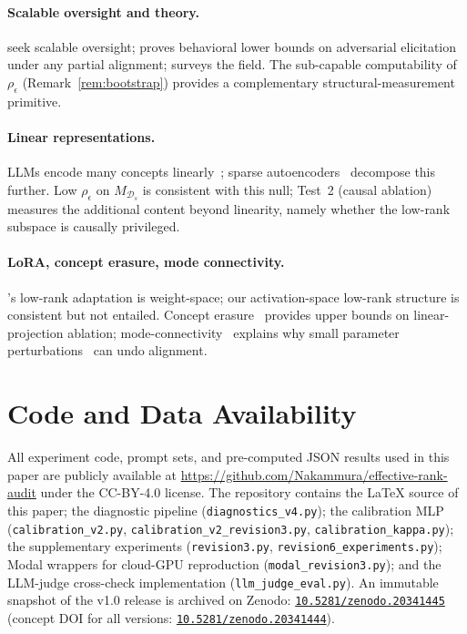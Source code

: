 \documentclass[10pt]{article}
\theoremstyle{definition}
\theoremstyle{remark}
\begin{document}
\paragraph{Scalable oversight and theory.}
\citet{leike2018scalable, amodei2016concrete,
irving2018ai} seek scalable oversight; \citet{wolf2024fundamental}
proves behavioral lower bounds on adversarial elicitation under
any partial alignment;
\citet{ngo2024alignment} surveys the field.
The sub-capable computability of $\rho_{\epsilon}$
(Remark~\ref{rem:bootstrap}) provides a
complementary structural-measurement primitive.

\paragraph{Linear representations.}
LLMs encode many concepts
linearly~\citep{mikolov2013linguistic,
park2024linear, marks2023geometry, hernandez2024linearity};
sparse autoencoders~\citep{templeton2024scaling}
decompose this further.
Low $\rho_{\epsilon}$ on $M_{\mathcal{D}_s}$ is
consistent with this null;
Test~2 (causal ablation) measures the additional
content beyond linearity, namely whether the
low-rank subspace is causally privileged.

\paragraph{LoRA, concept erasure, mode connectivity.}
\citet{hu2022lora}'s low-rank adaptation is
weight-space; our activation-space low-rank
structure is consistent but not entailed.
Concept erasure~\citep{ravfogel2020null,
belrose2023leace} provides upper bounds on
linear-projection ablation;
mode-connectivity~\citep{garipov2018loss,
frankle2020linear} explains why small parameter
perturbations~\citep{lermen2023lora} can undo
alignment.


\section*{Code and Data Availability}

All experiment code, prompt sets, and pre-computed JSON results
used in this paper are publicly available at
\url{https://github.com/Nakammura/effective-rank-audit} under the
CC-BY-4.0 license.  The repository contains the LaTeX source of
this paper; the diagnostic pipeline
(\texttt{diagnostics\_v4.py}); the calibration MLP
(\texttt{calibration\_v2.py},
\texttt{calibration\_v2\_revision3.py},
\texttt{calibration\_kappa.py}); the supplementary experiments
(\texttt{revision3.py}, \texttt{revision6\_experiments.py});
Modal wrappers for cloud-GPU reproduction
(\texttt{modal\_revision3.py}); and the LLM-judge cross-check
implementation (\texttt{llm\_judge\_eval.py}).  An immutable
snapshot of the v1.0 release is archived on Zenodo:
\href{https://doi.org/10.5281/zenodo.20341445}{\texttt{10.5281/zenodo.20341445}}
(concept DOI for all versions:
\href{https://doi.org/10.5281/zenodo.20341444}{\texttt{10.5281/zenodo.20341444}}).
\end{document}
